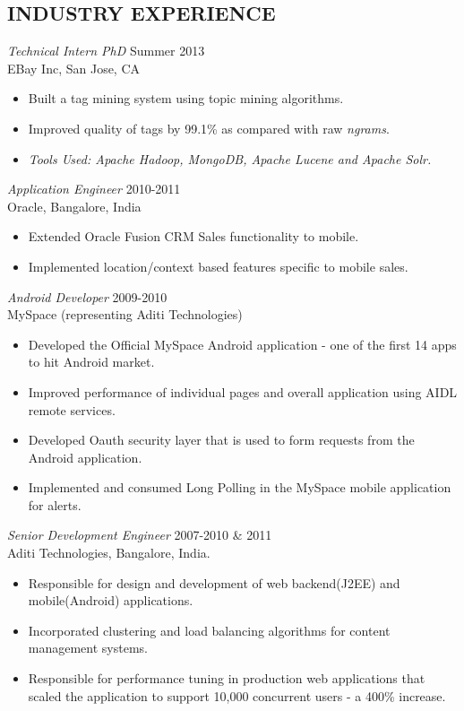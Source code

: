 \documentclass[line,margin]{res}
\begin{document}
\begin{resume}
\section{INDUSTRY EXPERIENCE} 
{\sl Technical Intern PhD} \hfill Summer 2013\\
                EBay Inc, San Jose, CA
                 \begin{itemize}  \itemsep -2pt %
                 \item Built a tag mining system using topic mining algorithms.
                 \item Improved quality of tags by 99.1\% as compared with raw \emph{ngrams}.
                 \item \emph{Tools Used: Apache Hadoop, MongoDB, Apache Lucene and Apache Solr.}
                \end{itemize}
{\sl Application Engineer} \hfill 2010-2011 \\
               Oracle, 
                Bangalore, India
                 \begin{itemize}  \itemsep -2pt %
                 \item Extended Oracle Fusion CRM Sales functionality to mobile.
                 \item Implemented location/context based features specific to mobile sales.
                \end{itemize}
                 {\sl Android Developer} \hfill            2009-2010 \\
                MySpace (representing Aditi Technologies) 
                 \begin{itemize}  \itemsep -2pt %
                 \item Developed the Official MySpace Android application - one of the first 14 apps to hit Android market.
                 \item Improved performance of individual pages and overall application using AIDL
remote services.
				 \item Developed Oauth security layer that is used to form requests from the Android application. 
 \item Implemented and consumed Long Polling in the MySpace mobile application for alerts.
                 \end{itemize} 
                {\sl Senior Development Engineer} \hfill        2007-2010 \& 2011 \\
                Aditi Technologies, Bangalore, India.
                  \begin{itemize}
                   \item Responsible for design and development of web backend(J2EE) and mobile(Android) applications.
                    \item Incorporated clustering and load balancing algorithms for content management systems.
                    \item Responsible for performance tuning in production web applications that scaled the application to support 10,000 concurrent users - a 400\% increase.
                   \end{itemize} 


\end{resume}
\end{document}
